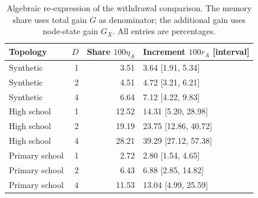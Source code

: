 \documentclass[preprint,11pt,sort&compress]{elsarticle}
\begin{document}
\begin{table}[ht]\centering\small
\caption{Algebraic re-expression of the withdrawal comparison. The memory share uses total gain $G$ as denominator; the additional gain uses node-state gain $G_X$. All entries are percentages.}\label{tab:relative_effects}
\begin{tabular}{lrrl}\toprule
Topology & $D$ & Share $100\eta_A$ & Increment $100r_A$ [interval]\\\midrule
Synthetic & 1 & 3.51 & 3.64 [1.91, 5.34]\\
Synthetic & 2 & 4.51 & 4.72 [3.21, 6.21]\\
Synthetic & 4 & 6.64 & 7.12 [4.22, 9.83]\\
High school & 1 & 12.52 & 14.31 [5.20, 28.98]\\
High school & 2 & 19.19 & 23.75 [12.86, 40.72]\\
High school & 4 & 28.21 & 39.29 [27.12, 57.38]\\
Primary school & 1 & 2.72 & 2.80 [1.54, 4.65]\\
Primary school & 2 & 6.43 & 6.88 [2.85, 14.82]\\
Primary school & 4 & 11.53 & 13.04 [4.99, 25.59]\\
\bottomrule\end{tabular}\end{table}
\end{document}
